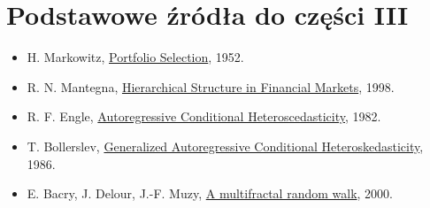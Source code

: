 \section*{Podstawowe źródła do części III}
\begin{itemize}
\item H. Markowitz,
\href{https://onlinelibrary.wiley.com/doi/10.1111/j.1540-6261.1952.tb01525.x}
{Portfolio Selection}, 1952.
\item R. N. Mantegna,
\href{https://arxiv.org/abs/cond-mat/9802256}
{Hierarchical Structure in Financial Markets}, 1998.
\item R. F. Engle,
\href{https://web.pdx.edu/~crkl/ec572/readings/Engle82.pdf}
{Autoregressive Conditional Heteroscedasticity}, 1982.
\item T. Bollerslev,
\href{https://www.sciencedirect.com/science/article/pii/0304407686900631}
{Generalized Autoregressive Conditional Heteroskedasticity}, 1986.
\item E. Bacry, J. Delour, J.-F. Muzy,
\href{https://arxiv.org/abs/cond-mat/0005405}
{A multifractal random walk}, 2000.
\end{itemize}

